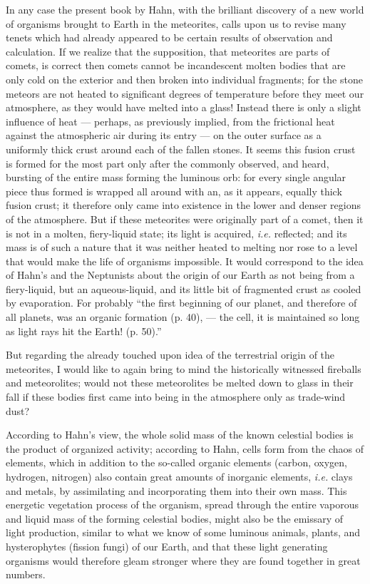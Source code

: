 \documentclass[a4paper, 12pt, oneside]{article}
\begin{document}
In any case the present book by Hahn, with the brilliant discovery of a new world of organisms brought to Earth in the meteorites, calls upon us to revise many tenets which had already appeared to be certain results of observation and calculation. If we realize that the supposition, that meteorites are parts of comets, is correct then comets cannot be incandescent molten bodies that are only cold on the exterior and then broken into individual fragments; for the stone meteors are not heated to significant degrees of temperature before they meet our atmosphere, as they would have melted into a glass! Instead there is only a slight influence of heat --- perhaps, as previously implied, from the frictional heat against the atmospheric air during its entry --- on the outer surface as a uniformly thick crust around each of the fallen stones. It seems this fusion crust is formed for the most part only after the commonly observed, and heard, bursting of the entire mass forming the luminous orb: for every single angular piece thus formed is wrapped all around with an, as it appears, equally thick fusion crust; it therefore only came into existence in the lower and denser regions of the atmosphere. But if these meteorites were originally part of a comet, then it is not in a molten, fiery-liquid state; its light is acquired, \emph{i.e.} reflected; and its mass is of such a nature that it was neither heated to melting nor rose to a level that would make the life of organisms impossible. It would correspond to the idea of Hahn's and the Neptunists about the origin of our Earth as not being from a fiery-liquid, but an aqueous-liquid, and its little bit of fragmented crust as cooled by evaporation. For probably ``the first beginning of our planet, and therefore of all planets, was an organic formation (p. 40), --- the cell, it is maintained so long as light rays hit the Earth! (p. 50).''

But regarding the already touched upon idea of the terrestrial origin of the meteorites, I would like to again bring to mind the historically witnessed fireballs and meteorolites; would not these meteorolites be melted down to glass in their fall if these bodies first came into being in the atmosphere only as trade-wind dust?

According to Hahn's view, the whole solid mass of the known celestial bodies is the product of organized activity; according to Hahn, cells form from the chaos of elements, which in addition to the so-called organic elements (carbon, oxygen, hydrogen, nitrogen) also contain great amounts of inorganic elements, \emph{i.e.} clays and metals, by assimilating and incorporating them into their own mass. This energetic vegetation process of the organism, spread through the entire vaporous and liquid mass of the forming celestial bodies, might also be the emissary of light production, similar to what we know of some luminous animals, plants, and hysterophytes (fission fungi) of our Earth, and that these light generating organisms would therefore gleam stronger where they are found together in great numbers.
\end{document}
